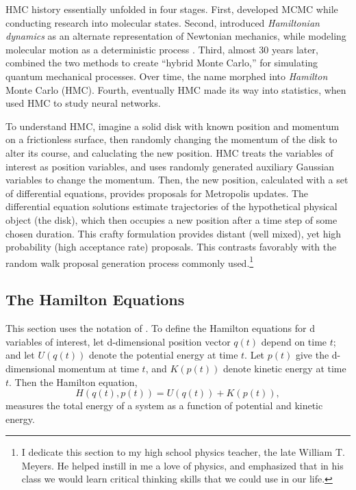 HMC history essentially unfolded in four stages. First, \cite{Metropolis1953} developed MCMC while conducting research into molecular states. Second, \cite{Alder1959} introduced {\it Hamiltonian dynamics} as an alternate representation of Newtonian mechanics, while modeling molecular motion as a deterministic process \citep{Newt}. Third, almost 30 years later, \cite{Duane1987} combined the two methods to create ``hybrid Monte Carlo,'' for simulating quantum mechanical processes. Over time, the name morphed into {\it Hamilton} Monte Carlo (HMC). Fourth, eventually HMC made its way into statistics, when \cite{Neal1996} used HMC to study neural networks.

To understand HMC, imagine a solid disk with known position and momentum on a frictionless surface, then randomly changing the momentum of the disk to alter its course, and caluclating the new position. HMC treats the variables of interest as position variables, and uses randomly generated auxiliary Gaussian variables to change the momentum. Then, the new position, calculated with a set of differential equations, provides proposals for Metropolis updates. The differential equation solutions estimate trajectories of the hypothetical physical object (the disk), which then occupies a new position after a time step of some chosen duration. This crafty formulation provides distant (well mixed), yet high probability (high acceptance rate) proposals. This contrasts favorably with the random walk proposal generation process commonly used.\footnote{I dedicate this section to my high school physics teacher, the late William T. Meyers. He helped instill in me a love of physics, and emphasized that in his class we would learn critical thinking skills that we could use in our life.}

\subsection{The Hamilton Equations} %

This section uses the notation of \cite{Neal2011}. To define the Hamilton equations for d variables of interest, let d-dimensional position vector $q(t)$ depend on time $t$; and let $U(q(t))$ denote the potential energy at time $t$. Let $p(t)$ give the d-dimensional momentum at time $t$, and $K(p(t))$ denote kinetic energy at time $t$. Then the Hamilton equation,
\begin{equation}
H(q(t),p(t)) = U(q(t)) + K(p(t)),
\end{equation}
measures the total energy of a system as a function of potential and kinetic energy. 

